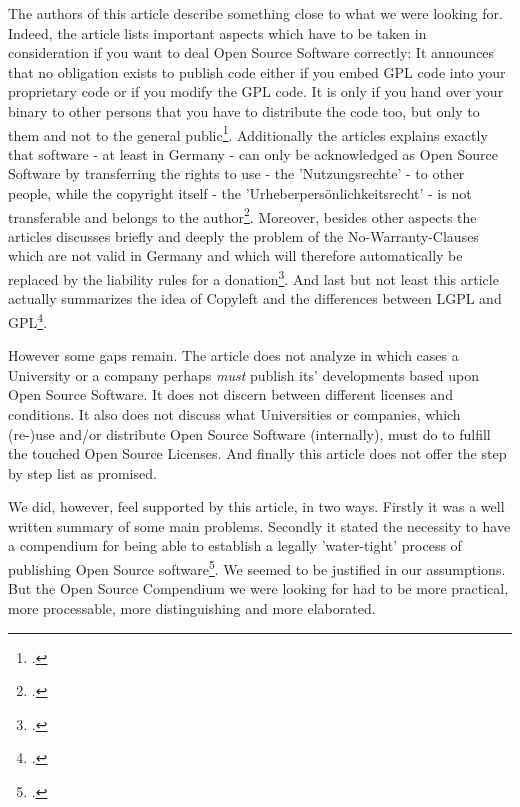 The authors of this article describe something close to what we were looking
for. Indeed, the article lists important aspects which have to be taken in
consideration if you want to deal Open Source Software correctly: It announces
that no obligation exists to publish code either if you embed GPL code into your
proprietary code or if you modify the GPL code. It is only if you hand over your
binary to other persons that you have to distribute the code too, but only to
them and not to the general public\footcite[cf.][170 and
181]{BreGlaGra2008a}. Additionally the articles explains exactly that software
- at least in Germany - can only be acknowledged as Open Source Software by
transferring the rights to use - the 'Nutzungsrechte' - to other people, while
the copyright itself - the 'Urheberpersönlichkeitsrecht' - is not transferable
and belongs to the author\footcite[cf.][173]{BreGlaGra2008a}. Moreover,
besides other aspects the articles discusses briefly and deeply the problem of
the No-Warranty-Clauses which are not valid in Germany and which will therefore
automatically be replaced by the liability rules for a
donation\footcite[cf.][177]{BreGlaGra2008a}. And last but not least this
article actually summarizes the idea of Copyleft and the differences between
LGPL and GPL\footcite[cf.][181]{BreGlaGra2008a}.

However some gaps remain. The article does not analyze in which cases a
University or a company perhaps \emph{must} publish its' developments based
upon Open Source Software. It does not discern between different licenses
and conditions. It also does not discuss what Universities or companies,
which (re-)use and/or distribute Open Source Software (internally), must do to
fulfill the touched Open Source Licenses. And finally this article
does not offer the step by step list as promised.

We did, however, feel supported by this article, in two ways. Firstly it was a
well written summary of some main problems. Secondly it stated the necessity to
have a compendium for being able to establish a legally 'water-tight' process of
publishing Open Source software\footcite[cf.][186]{BreGlaGra2008a}. We
seemed to be justified in our assumptions. But the Open Source Compendium we
were looking for had to be more practical, more processable, more distinguishing
and more elaborated.

%
